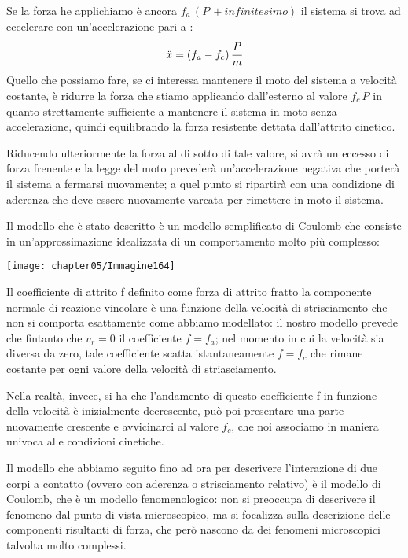 Se la forza he applichiamo è ancora $f_a\,(P\,+ infinitesimo)$ il sistema si trova ad eccelerare con un'accelerazione pari a :
\[\ddot{x} = (f_a - f_c)\,\cfrac{P}{m}\]
Quello che possiamo fare, se ci interessa mantenere il moto del sistema a velocità costante, è ridurre la forza che stiamo applicando dall'esterno al valore $f_c\,P$ in quanto strettamente sufficiente a mantenere il sistema in moto senza accelerazione, quindi equilibrando la forza resistente dettata dall'attrito cinetico.

Riducendo ulteriormente la forza al di sotto di tale valore, si avrà un eccesso di forza frenente e la legge del moto prevederà un'accelerazione negativa che porterà il sistema a fermarsi nuovamente; a quel punto si ripartirà con una condizione di aderenza che deve essere nuovamente varcata per rimettere in moto il sistema.

Il modello che è stato descritto è un modello semplificato di Coulomb che consiste in un'approssimazione idealizzata di un comportamento molto più complesso:

 \begin{minipage}{.5\textwidth}
 \centering
 \texttt{[image: chapter05/Immagine164]}
 \end{minipage}
 \hfill
 \begin{minipage}{.5\textwidth}
  Il coefficiente di attrito f definito come forza di attrito fratto la componente normale di reazione vincolare è una funzione della velocità di strisciamento che non si comporta esattamente come abbiamo modellato: il nostro modello prevede che fintanto che $v_r = 0$ il coefficiente $f = f_a$; nel momento in cui la velocità sia diversa da zero, tale coefficiente scatta istantaneamente $f = f_c$ che rimane costante per ogni valore della velocità di striasciamento.
\end{minipage}
\vspace{1mm}

 Nella realtà, invece, si ha che l'andamento di questo coefficiente f in funzione della velocità è inizialmente decrescente, può poi presentare una parte nuovamente crescente e avvicinarci al valore $f_c$, che noi associamo in maniera univoca alle condizioni cinetiche.

Il modello che abbiamo seguito fino ad ora per descrivere l'interazione di due corpi a contatto (ovvero con aderenza o strisciamento relativo) è il modello di Coulomb, che è un modello fenomenologico: non si preoccupa di descrivere il fenomeno dal punto di vista microscopico, ma si focalizza sulla descrizione delle componenti risultanti di forza, che però nascono da dei fenomeni microscopici talvolta molto complessi.

